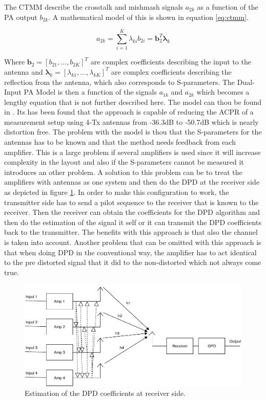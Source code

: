 The CTMM describe the crosstalk and mishmash signals $a_{2k}$ as a function of the PA output $b_{2k}$. A mathematical model of this is shown in equation \ref{eq:ctmm}.

\begin{equation} \label{eq:ctmm}
 a_{2k} = \sum_{i=1}^{K} \lambda_{ki} b_{2i} = \boldsymbol{b}_2^T \boldsymbol{\lambda}_k
\end{equation}

Where $\boldsymbol{b}_2 = [b_{21},...,b_{2K}]^T$ are complex coefficients describing the input to the antenna and $\boldsymbol{\lambda}_k = [\lambda_{k1},...,\lambda_{kK}]^T$ are complex coefficients describing the reflection from the antenna, which also corresponds to S-parameters. The Dual-Input PA Model is then a function of the signals $a_{1k}$ and $a_{2k}$ which becomes a lengthy equation that is not further described here. The model can thou be found in \citep{Hausmair2017}. Its has been found that the approach is capable of reducing the ACPR of a measurement setup using 4-Tx antennas from -36.3dB to -50.7dB which is nearly distortion free. The problem with the model is thou that the S-parameters for the antennas has to be known and that the method needs feedback from each amplifier. This is a large problem if several amplifiers is used since it will increase complexity in the layout and also if the S-parameters cannot be measured it introduces an other problem. A solution to this problem can be to treat the amplifiers with antennas as one system and then do the DPD at the receiver side as depicted in figure \ref{fig:dpd_pdpd}. In order to make this configuration to work, the transmitter side has to send a pilot sequence to the receiver that is known to the receiver. Then the receiver can obtain the coefficients for the DPD algorithm and then do the estimation of the signal it self or it can transmit the DPD coefficients back to the transmitter. The benefits with this approach is that also the channel is taken into account. Another problem that can be omitted with this approach is that when doing DPD in the conventional way, the amplifier has to act identical to the pre distorted signal that it did to the non-distorted which not always come true.

 
\begin{figure}[H]
\centering 
\includegraphics[scale = 0.7]{figures/ch1/postDPD.pdf}
\caption{Estimation of the DPD coefficients at receiver side. }
\label{fig:dpd_pdpd}
\end{figure}

